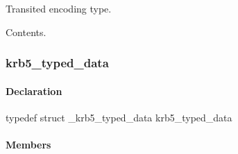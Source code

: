 \documentclass[letterpaper,10pt,english]{sphinxmanual}
\begin{document}

\begin{fulllineitems}
\label{appdev/refs/types/krb5_transited:krb5_transited.tr_type}
Transited encoding type.

\end{fulllineitems}


\begin{fulllineitems}
\label{appdev/refs/types/krb5_transited:krb5_transited.tr_contents}
Contents.

\end{fulllineitems}



\subsubsection{krb5\_typed\_data}
\label{appdev/refs/types/krb5_typed_data:krb5-typed-data-struct}\label{appdev/refs/types/krb5_typed_data::doc}\label{appdev/refs/types/krb5_typed_data:krb5-typed-data}

\begin{fulllineitems}
\label{appdev/refs/types/krb5_typed_data:krb5_typed_data}
\end{fulllineitems}



\paragraph{Declaration}
\label{appdev/refs/types/krb5_typed_data:declaration}
typedef struct \_krb5\_typed\_data  krb5\_typed\_data


\paragraph{Members}
\label{appdev/refs/types/krb5_typed_data:members}

\begin{fulllineitems}
\label{appdev/refs/types/krb5_typed_data:krb5_typed_data.magic}
\end{fulllineitems}
\end{document}
